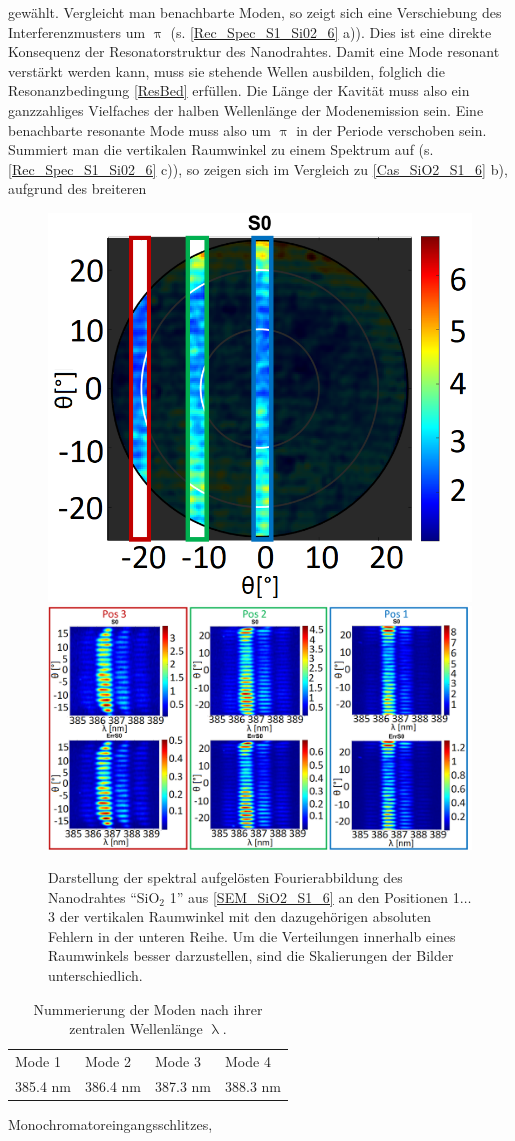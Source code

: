 gewählt. Vergleicht man benachbarte Moden, so zeigt sich eine Verschiebung des
Interferenzmusters um $\uppi$ (s. \autoref{Rec_Spec_S1_Si02_6} a)). Dies ist
eine direkte Konsequenz der Resonatorstruktur des Nanodrahtes. Damit eine Mode
resonant verstärkt werden kann, muss sie stehende Wellen ausbilden, folglich die
Resonanzbedingung \autoref{ResBed} erfüllen. Die Länge der Kavität muss also ein
ganzzahliges Vielfaches der halben Wellenlänge der Modenemission sein. Eine
benachbarte resonante Mode muss also um $\uppi$ in der Periode verschoben sein.
Summiert man die vertikalen Raumwinkel zu einem Spektrum auf (s.
\autoref{Rec_Spec_S1_Si02_6} c)), so zeigen sich im Vergleich zu
\autoref{Cas_SiO2_S1_6} b), aufgrund des breiteren\begin{figure}[h] \centering
\includegraphics[width=.33\textwidth]{Bilder/SiO2/S0_Spec_1_S1_Si02_6}
\includegraphics[width=.75\textwidth]{Bilder/SiO2/S0_Spec_S1_Si02_6}
\caption{Darstellung der spektral aufgelösten Fourierabbildung des Nanodrahtes
``SiO$_\text{2}$ 1'' aus \autoref{SEM_SiO2_S1_6} an den Positionen 1$\ldots$3
der vertikalen Raumwinkel mit den dazugehörigen absoluten Fehlern in der unteren
Reihe. Um die Verteilungen innerhalb eines Raumwinkels besser darzustellen, sind
die Skalierungen der Bilder unterschiedlich.} \label{S0_Spec_S1_Si02_6}
\end{figure}\begin{table}[h] \begin{tabular}{llll} Mode 1 & Mode 2 & Mode 3 &
Mode 4 \\ 385.4 nm & 386.4 nm & 387.3 nm & 388.3 nm \\ \end{tabular}
\caption{Nummerierung der Moden nach ihrer zentralen Wellenlänge $\uplambda$.}
\label{ModenNum} \end{table}\noindent Monochromatoreingangsschlitzes,
